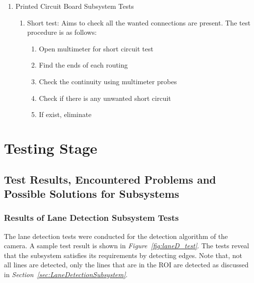 \documentclass[a4paper,12pt]{article}
\begin{document}
\begin{enumerate}
\item {Printed Circuit Board Subsystem Tests}


\begin{enumerate}

\item Short test: Aims to check all the wanted connections are present. The test procedure is as follows:

\begin{enumerate} 

\item Open multimeter for short circuit test  

\item Find the ends of each routing 

\item Check the continuity using multimeter probes

\item Check if there is any unwanted short circuit

\item If exist, eliminate

\end{enumerate}

\end{enumerate}




\end{enumerate}




\section{Testing Stage}


\subsection{Test Results, Encountered Problems and Possible Solutions for Subsystems}	


\subsubsection*{Results of Lane Detection Subsystem Tests}


The lane detection tests were conducted for the detection algorithm of the camera. A sample test result is shown in \textit{Figure~\ref{fig:laneD_test}}. The tests reveal that the subsystem satisfies its requirements by detecting edges. Note that, not all lines are detected, only the lines that are in the ROI are detected as discussed in \textit{Section~\ref{sec:LaneDetectionSubsystem}}.
\end{document}
